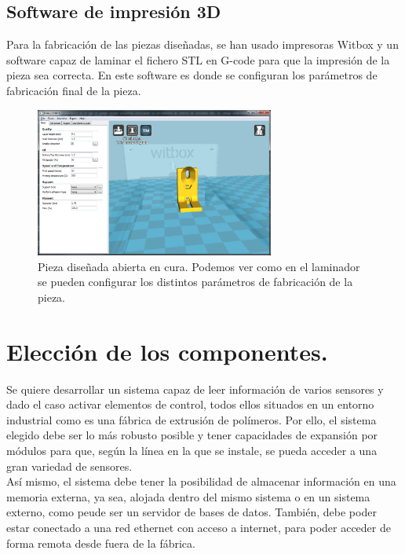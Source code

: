 \subsection{Software de impresión 3D}
Para la fabricación de las piezas diseñadas, se han usado impresoras Witbox y un software capaz de laminar el fichero STL en G-code para que la impresión de la pieza sea correcta. En este software es donde se configuran los parámetros de fabricación final de la pieza.

\begin{figure}[H]
    \centering
    \includegraphics[width=0.7\textwidth]{images/cura.png}
    \caption[Pieza diseñada abierta en cura.]{Pieza diseñada abierta en cura. Podemos ver como en el laminador se pueden configurar los distintos parámetros de fabricación de la pieza.}
    \label{fig:cura}
\end{figure}


\section{Elección de los componentes.}

Se quiere desarrollar un sistema capaz de leer información de varios sensores y dado el caso activar elementos de control, todos ellos situados en un entorno industrial como es una fábrica de extrusión de polímeros. Por ello, el sistema elegido debe ser lo más robusto posible y tener capacidades de expansión por módulos para que, según la línea en la que se instale, se pueda acceder a una gran variedad de sensores.\\ 

Así mismo, el sistema debe tener la posibilidad de almacenar información en una memoria externa, ya sea, alojada dentro del mismo sistema o en un sistema externo, como peude ser un servidor de bases de datos. También, debe poder estar conectado a una red ethernet con acceso a internet, para poder acceder de forma remota desde fuera de la fábrica.\\ 

